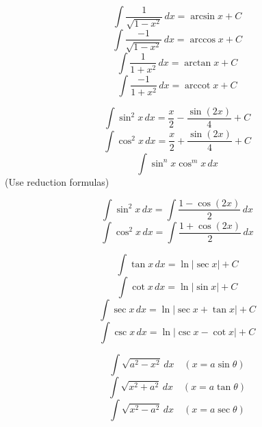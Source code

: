 \documentclass{report}
\DeclareMathOperator{\arccot}{arccot}
\begin{document}
\begin{multicols}{2}
    \[
    \int \frac{1}{\sqrt{1-x^2}} \, dx = \arcsin x + C
    \]
    \[
    \int \frac{-1}{\sqrt{1-x^2}} \, dx = \arccos x + C
    \]
    \[
    \int \frac{1}{1+x^2} \, dx = \arctan x + C
    \]
    \[
    \int \frac{-1}{1+x^2} \, dx = \arccot x + C
    \]

    \[
    \int \sin^2 x \, dx = \frac{x}{2} - \frac{\sin(2x)}{4} + C
    \]
    \[
    \int \cos^2 x \, dx = \frac{x}{2} + \frac{\sin(2x)}{4} + C
    \]
    \[
    \int \sin^n x \cos^m x \, dx
    \]
    (Use reduction formulas)

    \[
    \int \sin^2 x \, dx = \int \frac{1 - \cos(2x)}{2} \, dx
    \]
    \[
    \int \cos^2 x \, dx = \int \frac{1 + \cos(2x)}{2} \, dx
    \]

    \[
    \int \tan x \, dx = \ln|\sec x| + C
    \]
    \[
    \int \cot x \, dx = \ln|\sin x| + C
    \]
    \[
    \int \sec x \, dx = \ln|\sec x + \tan x| + C
    \]
    \[
    \int \csc x \, dx = \ln|\csc x - \cot x| + C
    \]

    \[
    \int \sqrt{a^2 - x^2} \, dx \quad (x = a\sin\theta)
    \]
    \[
    \int \sqrt{x^2 + a^2} \, dx \quad (x = a\tan\theta)
    \]
    \[
    \int \sqrt{x^2 - a^2} \, dx \quad (x = a\sec\theta)
    \]
\end{multicols}
\end{document}
